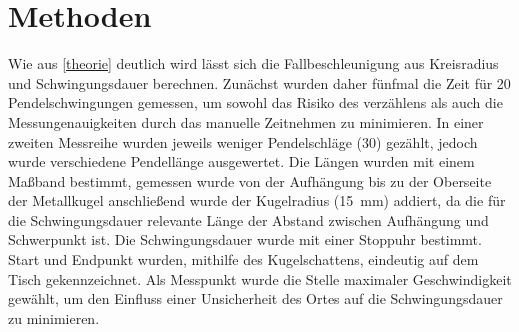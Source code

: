 \section{Methoden}
Wie aus \cref{theorie} deutlich wird lässt sich die Fallbeschleunigung aus Kreisradius und Schwingungsdauer berechnen. Zunächst wurden daher fünfmal die Zeit für 20 Pendelschwingungen gemessen, um sowohl das Risiko des verzählens als auch die Messungenauigkeiten durch das manuelle Zeitnehmen zu minimieren. In einer zweiten Messreihe wurden jeweils weniger Pendelschläge (30) gezählt, jedoch wurde verschiedene Pendellänge ausgewertet.
Die Längen wurden mit einem Maßband bestimmt, gemessen wurde von der Aufhängung bis zu der Oberseite der Metallkugel anschließend wurde der Kugelradius (\SI{15}{mm}) addiert, da die für die Schwingungsdauer relevante Länge der Abstand zwischen Aufhängung und Schwerpunkt ist.
Die Schwingungsdauer wurde mit einer Stoppuhr bestimmt. Start und Endpunkt wurden, mithilfe des Kugelschattens, eindeutig auf dem Tisch gekennzeichnet. Als Messpunkt wurde die Stelle maximaler Geschwindigkeit gewählt, um den Einfluss einer Unsicherheit des Ortes auf die Schwingungsdauer zu minimieren. 
